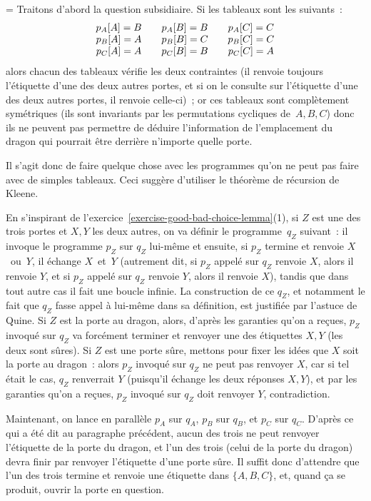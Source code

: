 \documentclass[12pt,a4paper]{article}
\theoremstyle{definition}
\newif\ifcorrige
\newenvironment{corrige}%
{\ifcorrige\relax\else\setbox0=\vbox\bgroup\fi%
\smallbreak\footnotesize\noindent{\underbar{\textit{Corrigé.}}\quad}}
{{\hbox{}\nobreak\hfill\checkmark}%
\ifcorrige\relax\else\egroup\fi\par}
\begin{document}
\begin{corrige}
Traitons d'abord la question subsidiaire.  Si les tableaux sont les
suivants :
\[
\begin{array}{c@{\hskip 2em}c@{\hskip 2em}c}
p_A[A] = B & p_A[B] = B & p_A[C] = C\\
p_B[A] = A & p_B[B] = C & p_B[C] = C\\
p_C[A] = A & p_C[B] = B & p_C[C] = A\\
\end{array}
\]
alors chacun des tableaux vérifie les deux contraintes (il renvoie
toujours l'étiquette d'une des deux autres portes, et si on le
consulte sur l'étiquette d'une des deux autres portes, il renvoie
celle-ci) ; or ces tableaux sont complètement symétriques (ils sont
invariants par les permutations cycliques de $A,B,C$) donc ils ne
peuvent pas permettre de déduire l'information de l'emplacement du
dragon qui pourrait être derrière n'importe quelle porte.

Il s'agit donc de faire quelque chose avec les programmes qu'on ne
peut pas faire avec de simples tableaux.  Ceci suggère d'utiliser le
théorème de récursion de Kleene.

En s'inspirant de l'exercice \ref{exercise-good-bad-choice-lemma}(1),
si $Z$ est une des trois portes et $X,Y$ les deux autres, on va
définir le programme $q_Z$ suivant : il invoque le programme $p_Z$ sur
$q_Z$ lui-même et ensuite, si $p_Z$ termine et renvoie $X$ ou $Y$, il
échange $X$ et $Y$ (autrement dit, si $p_Z$ appelé sur $q_Z$ renvoie
$X$, alors il renvoie $Y$, et si $p_Z$ appelé sur $q_Z$ renvoie $Y$,
alors il renvoie $X$), tandis que dans tout autre cas il fait une
boucle infinie.  La construction de ce $q_Z$, et notamment le fait que
$q_Z$ fasse appel à lui-même dans sa définition, est justifiée par
l'astuce de Quine.  Si $Z$ est la porte au dragon, alors, d'après les
garanties qu'on a reçues, $p_Z$ invoqué sur $q_Z$ va forcément
terminer et renvoyer une des étiquettes $X,Y$ (les deux sont sûres).
Si $Z$ est une porte sûre, mettons pour fixer les idées que $X$ soit
la porte au dragon : alors $p_Z$ invoqué sur $q_Z$ ne peut pas
renvoyer $X$, car si tel était le cas, $q_Z$ renverrait $Y$ (puisqu'il
échange les deux réponses $X,Y$), et par les garanties qu'on a reçues,
$p_Z$ invoqué sur $q_Z$ doit renvoyer $Y$, contradiction.

Maintenant, on lance en parallèle $p_A$ sur $q_A$, $p_B$ sur $q_B$, et
$p_C$ sur $q_C$. D'après ce qui a été dit au paragraphe précédent,
aucun des trois ne peut renvoyer l'étiquette de la porte du dragon, et
l'un des trois (celui de la porte du dragon) devra finir par renvoyer
l'étiquette d'une porte sûre.  Il suffit donc d'attendre que l'un des
trois termine et renvoie une étiquette dans $\{A,B,C\}$, et, quand ça
se produit, ouvrir la porte en question.
\end{corrige}
\end{document}
